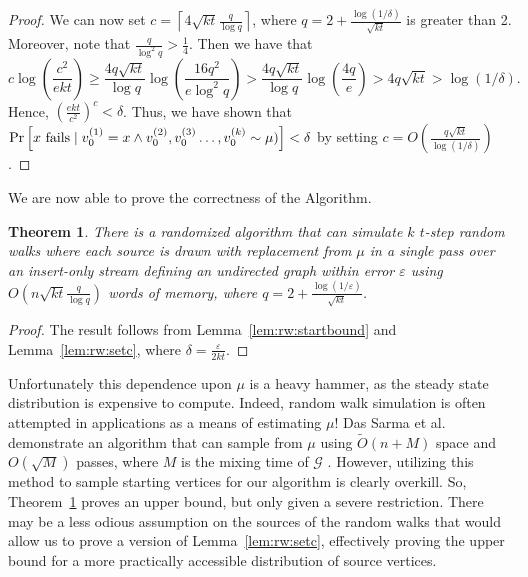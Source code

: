 \documentclass[10]{report}
\newtheorem{theorem}{Theorem}[section]
\begin{document}
\begin{proof}
We can now set $c = \left \lceil 4 \sqrt{kt} \frac{q}{\log q} \right \rceil$, where $q = 2 + \frac{\log (1/\delta)}{\sqrt{kt}}$ is greater than 2. 
Moreover, note that $\frac{q}{\log^2 q} > \frac{1}{4}$.
Then we have that 
%
\begin{equation*}
c \log \left ( \frac{c^2}{ekt} \right ) 
\geq 
\frac{4 q \sqrt{kt}}{\log q} \log \left ( \frac{16q^2}{e \log^2q} \right )
>
\frac{4 q \sqrt{kt}}{\log q} \log \left ( \frac{4q}{e} \right )
> 
4 q\sqrt{kt}
> \log (1/\delta).
\end{equation*}
%
Hence, $\left ( \frac{ekt}{c^2} \right )^c < \delta$.
Thus, we have shown that $\Pr \left [ \textnormal{$x$ fails} \mid v_0^{(1)}  = x \wedge v_0^{(2)}, v_0^{(3)} \dots, v_{0}^{(k)} \sim \mu) \right ] < \delta$ by setting $c = O \left ( \frac{q \sqrt{kt}}{\log (1/\delta)} \right )$.

\end{proof}

We are now able to prove the correctness of the Algorithm.
%
\begin{theorem} \label{thm:rw:serial}
There is a randomized algorithm that can simulate $k$ $t$-step random walks where each source is drawn with replacement from $\mu$ in a single pass over an insert-only stream defining an undirected graph within error $\varepsilon$ using $O \left (n \sqrt{kt} \frac{q}{\log q} \right )$ words of memory, where $q = 2 + \frac{\log(1/\varepsilon)}{\sqrt{kt}}$.
\end{theorem}
%
\begin{proof}
The result follows from Lemma~\ref{lem:rw:startbound} and Lemma~\ref{lem:rw:setc}, where $\delta = \frac{\varepsilon}{2kt}$.
\end{proof}

Unfortunately this dependence upon $\mu$ is a heavy hammer, as the steady state distribution is expensive to compute. 
Indeed, random walk simulation is often attempted in applications as a means of estimating $\mu$!
Das Sarma et al. demonstrate an algorithm that can sample from $\mu$ using $\widetilde{O}(n + M)$ space and $O(\sqrt{M})$ passes, where $M$ is the mixing time of $\mathcal{G}$ \cite{sarma2011estimating}.
However, utilizing this method to sample starting vertices for our algorithm is clearly overkill.
So, Theorem~\ref{thm:rw:serial} proves an upper bound, but only given a severe restriction.
There may be a less odious assumption on the sources of the random walks that would allow us to prove a version of Lemma~\ref{lem:rw:setc}, effectively proving the upper bound for a more practically accessible distribution of source vertices.
\end{document}

